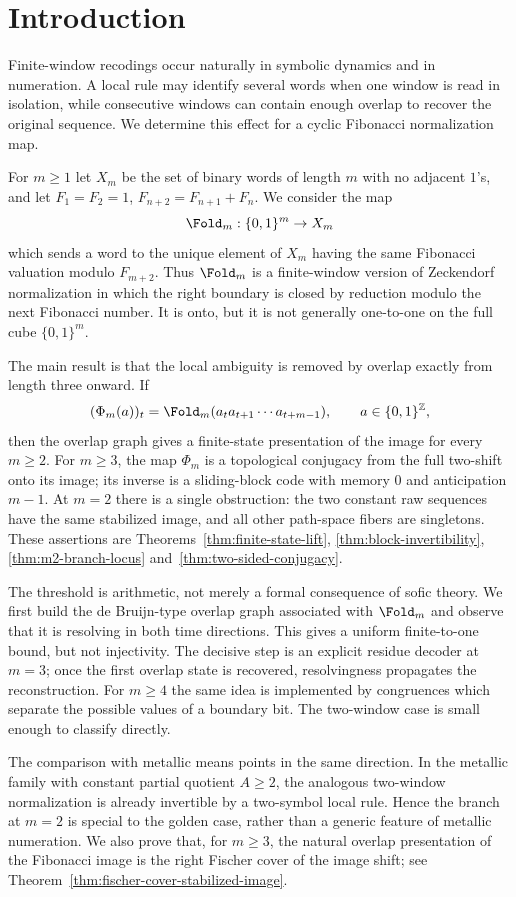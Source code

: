 \section{Introduction}\label{sec:intro}

Finite-window recodings occur naturally in symbolic dynamics and in numeration. A local rule may identify several words when one window is read in isolation, while consecutive windows can contain enough overlap to recover the original sequence. We determine this effect for a cyclic Fibonacci normalization map.

For $m\ge1$ let $X_m$ be the set of binary words of length $m$ with no adjacent $1$'s, and let $F_1=F_2=1$, $F_{n+2}=F_{n+1}+F_n$. We consider the map
\[
\Fold_m:\{0,1\}^m\to X_m
\]
which sends a word to the unique element of $X_m$ having the same Fibonacci valuation modulo $F_{m+2}$. Thus $\Fold_m$ is a finite-window version of Zeckendorf normalization in which the right boundary is closed by reduction modulo the next Fibonacci number. It is onto, but it is not generally one-to-one on the full cube $\{0,1\}^m$.

The main result is that the local ambiguity is removed by overlap exactly from length three onward. If
\[
(\Phi_m(a))_t=\Fold_m(a_ta_{t+1}\cdots a_{t+m-1}),\qquad a\in\{0,1\}^{\mathbb Z},
\]
then the overlap graph gives a finite-state presentation of the image for every $m\ge2$. For $m\ge3$, the map $\Phi_m$ is a topological conjugacy from the full two-shift onto its image; its inverse is a sliding-block code with memory $0$ and anticipation $m-1$. At $m=2$ there is a single obstruction: the two constant raw sequences have the same stabilized image, and all other path-space fibers are singletons. These assertions are Theorems~\ref{thm:finite-state-lift}, \ref{thm:block-invertibility}, \ref{thm:m2-branch-locus} and~\ref{thm:two-sided-conjugacy}.

The threshold is arithmetic, not merely a formal consequence of sofic theory. We first build the de Bruijn-type overlap graph associated with $\Fold_m$ and observe that it is resolving in both time directions. This gives a uniform finite-to-one bound, but not injectivity. The decisive step is an explicit residue decoder at $m=3$; once the first overlap state is recovered, resolvingness propagates the reconstruction. For $m\ge4$ the same idea is implemented by congruences which separate the possible values of a boundary bit. The two-window case is small enough to classify directly.

The comparison with metallic means points in the same direction. In the metallic family with constant partial quotient $A\ge2$, the analogous two-window normalization is already invertible by a two-symbol local rule. Hence the branch at $m=2$ is special to the golden case, rather than a generic feature of metallic numeration. We also prove that, for $m\ge3$, the natural overlap presentation of the Fibonacci image is the right Fischer cover of the image shift; see Theorem~\ref{thm:fischer-cover-stabilized-image}.

